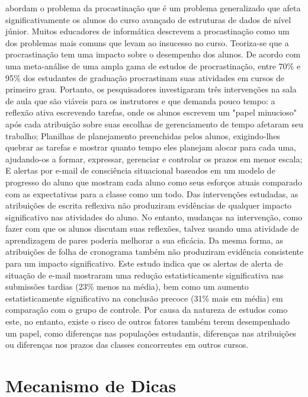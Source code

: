  abordam o problema da procastinação que é um problema generalizado que afeta significativamente os alunos do curso avançado de estruturas de dados de nível júnior. Muitos educadores de informática descrevem a procastinação como um dos problemas mais comuns que levam ao insucesso no curso. Teoriza-se que a procrastinação tem uma impacto sobre o desempenho dos alunos. De acordo com uma meta-análise de uma ampla gama de estudos de procrastinação, entre 70\% e 95\% dos estudantes de graduação procrastinam suas atividades em cursos de primeiro grau. Portanto, os pesquisadores investigaram três intervenções na sala de aula que são viáveis para os instrutores e que demanda pouco tempo: a reflexão ativa escrevendo tarefas, onde os alunos escrevem um "papel minucioso" após cada atribuição sobre suas escolhas de gerenciamento de tempo afetaram seu trabalho; Planilhas de planejamento preenchidas pelos alunos, exigindo-lhes quebrar as tarefas e mostrar quanto tempo eles planejam alocar para cada uma,  ajudando-os a formar, expressar, gerenciar e controlar os prazos em menor escala; E alertas por e-mail de consciência situacional baseados em um modelo de progresso do aluno que mostram cada aluno como seus esforços atuais comparado com as expectativas para a classe como um todo. Das intervenções estudadas, as atribuições de escrita reflexiva não produziram evidências de qualquer impacto significativo nas atividades do aluno. No entanto, mudanças na intervenção, como fazer com que os alunos discutam suas reflexões, talvez usando uma atividade de aprendizagem de pares poderia melhorar a sua eficácia. Da mesma forma, as atribuições de folha de cronograma também não produziram evidência consistente para um impacto significativo. Este estudo indica que os alertas de alerta de situação de e-mail mostraram uma redução estatisticamente significativa nas submissões tardias (23\% menos na média), bem como um aumento estatisticamente significativo na conclusão precoce (31\% mais em média) em comparação com o grupo de controle. Por causa da natureza de estudos como este, no entanto, existe o risco de outros fatores também terem desempenhado um papel, como diferenças nas populações estudantis, diferenças nas atribuições ou diferenças nos prazos das classes concorrentes em outros cursos.

\section{Mecanismo de Dicas}

